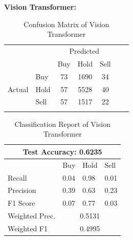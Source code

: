\documentclass[]{article}
\begin{document}
\textbf{Vision Transformer:}
\begin{table}[H]
    \centering
    \caption{Confusion Matrix of Vision Transformer}
    \begin{tabular}{llcccll}
        \cline{1-5}
        \multicolumn{1}{|l|}{} & \multicolumn{1}{l|}{} & \multicolumn{3}{c|}{Predicted} & & \\\cline{1-5} \multicolumn{1}{|l|}{} & \multicolumn{1}{l|}{} & \multicolumn{1}{l|}{Buy} & \multicolumn{1}{l|}{Hold} & \multicolumn{1}{l|}{Sell} & & \\\cline{1-5} \multicolumn{1}{|c|}{\multirow{3}{*}{Actual}} & \multicolumn{1}{l|}{Buy} & \multicolumn{1}{c|}{73} & \multicolumn{1}{c|}{1690} & \multicolumn{1}{c|}{34} & & \\\cline{2-5} \multicolumn{1}{|c|}{} & \multicolumn{1}{l|}{Hold} & \multicolumn{1}{c|}{57} & \multicolumn{1}{c|}{5528} & \multicolumn{1}{c|}{40} & & \\\cline{2-5} \multicolumn{1}{|c|}{} & \multicolumn{1}{l|}{Sell} & \multicolumn{1}{c|}{57} & \multicolumn{1}{c|}{1517} & \multicolumn{1}{c|}{22} & & \\\cline{1-5} & & \multicolumn{1}{l}{} & \multicolumn{1}{l}{} & \multicolumn{1}{l}{} & & 
    \end{tabular}
\end{table}
\begin{table}[H]
\centering
\caption{Classification Report of Vision Transformer}
\begin{tabular}{|llll|}
\hline
\multicolumn{4}{|c|}{\textbf{Test Accuracy: 0.6235}}                                                         \\ \hline
\multicolumn{1}{|l|}{}               & \multicolumn{1}{l|}{Buy}  & \multicolumn{1}{l|}{Hold} & Sell \\ \hline
\multicolumn{1}{|l|}{Recall}         & \multicolumn{1}{l|}{0.04} & \multicolumn{1}{l|}{0.98} & 0.01 \\ \hline
\multicolumn{1}{|l|}{Precision}      & \multicolumn{1}{l|}{0.39} & \multicolumn{1}{l|}{0.63} & 0.23 \\ \hline
\multicolumn{1}{|l|}{F1 Score}       & \multicolumn{1}{l|}{0.07} & \multicolumn{1}{l|}{0.77} & 0.03 \\ \hline
\multicolumn{1}{|l|}{Weighted Prec.} & \multicolumn{3}{c|}{0.5131}                                  \\ \hline
\multicolumn{1}{|l|}{Weighted F1}    & \multicolumn{3}{c|}{0.4995}                                  \\ \hline
\end{tabular}
\end{table}
\end{document}
